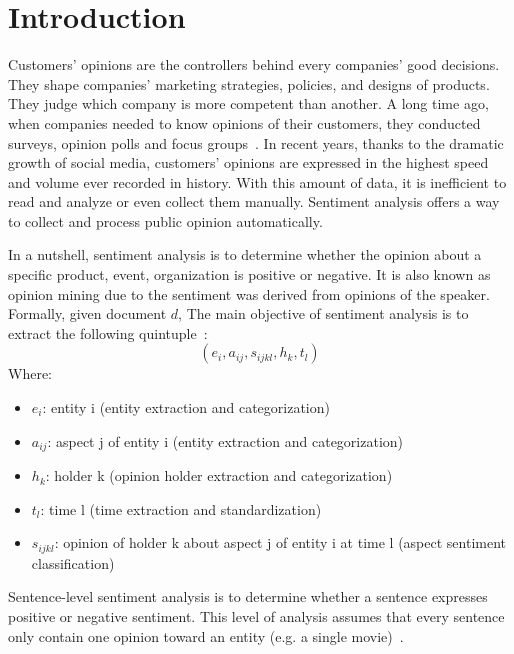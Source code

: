 \section{Introduction}
Customers' opinions are the controllers behind every companies' good decisions.
They shape companies' marketing strategies, policies, and designs of products.
They judge which company is more competent than another.
A long time ago, when companies needed to know opinions of their customers, they conducted surveys, opinion polls and focus groups~\cite{liu2012sentiment}.
In recent years, thanks to the dramatic growth of social media, customers' opinions are expressed in the highest speed and volume ever recorded in history.
With this amount of data, it is inefficient to read and analyze or even collect them manually. 
Sentiment analysis offers a way to collect and process public opinion automatically.

In a nutshell, sentiment analysis is to determine whether the opinion about a specific product, event, organization is positive or negative. 
It is also known as opinion mining due to the sentiment was derived from opinions of the speaker.
Formally, given document $d$, The main objective of sentiment analysis is to extract the following quintuple~\cite{liu2012sentiment}:
\[ ( e_{i}, a_{ij}, s_{ijkl}, h_{k}, t_{l} ) \]
Where:
\begin{itemize}
	\item $e_{i}$: entity i (entity extraction and categorization)
	\item $a_{ij}$: aspect j of entity i (entity extraction and categorization)
	\item $h_{k}$: holder k (opinion holder extraction and categorization)
	\item $t_{l}$: time l (time extraction and standardization)
	\item $s_{ijkl}$: opinion of holder k about aspect j of entity i at time l (aspect sentiment classification)
\end{itemize}
Sentence-level sentiment analysis is to determine whether a sentence expresses positive or negative sentiment. 
This level of analysis assumes that every sentence only contain one opinion toward an entity (e.g. a single movie)~\cite{liu2012sentiment}.

